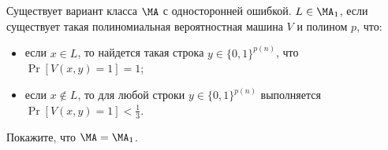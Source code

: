 Существует вариант класса $\MA$ с односторонней ошибкой. $L \in \MA_1$, если существует такая
полиномиальная вероятностная машина $V$ и полином $p$, что:
\begin{itemize}
    \item если $x \in L$, то найдется такая строка $y \in \{0, 1\}^{p(n)}$, что $\Pr[V(x, y) = 1] = 1$;
    \item если $x \notin L$, то для любой строки $y \in \{0, 1\}^{p(n)}$ выполняется $\Pr[V(x, y) = 1] <
        \frac{1}{3}$.
\end{itemize}
Покажите, что $\MA = \MA_1$.
